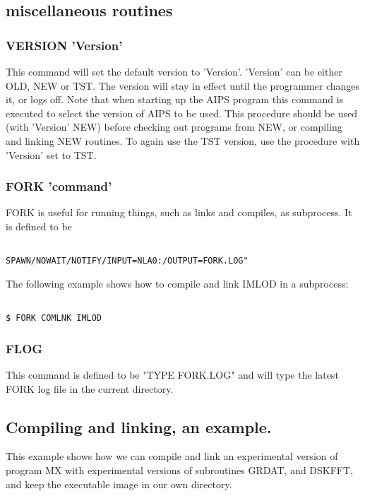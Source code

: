 \subsection{ miscellaneous routines }
\subsubsection{ VERSION 'Version' }

This command will set the default version to 'Version'. 'Version' can
be either OLD, NEW or TST.  The version will stay in effect until the
programmer changes it, or logs off.  Note that when starting up the
AIPS program this command is executed to select the version of AIPS to
be used.
This procedure should be used (with 'Version' NEW)
before checking out programs from NEW, or compiling and linking NEW routines.
To again use the TST version, use the procedure with 'Version' set to TST.

\subsubsection{ FORK 'command' }

FORK is useful for running things, such as links and compiles, as subprocess.
It is defined to be
\begin{verbatim}

SPAWN/NOWAIT/NOTIFY/INPUT=NLA0:/OUTPUT=FORK.LOG"

\end{verbatim}
The following example shows how to compile and link IMLOD in a subprocess:
\begin{verbatim}

$ FORK COMLNK IMLOD

\end{verbatim}

\subsubsection{ FLOG }

This command is defined to be "TYPE FORK.LOG" and will type the latest
FORK log file in the current directory.

\subsection{ Compiling and linking, an example. }

This example shows how we can compile and link an experimental
version of program MX with experimental versions of subroutines
GRDAT, and DSKFFT, and keep the executable image in our own directory.

